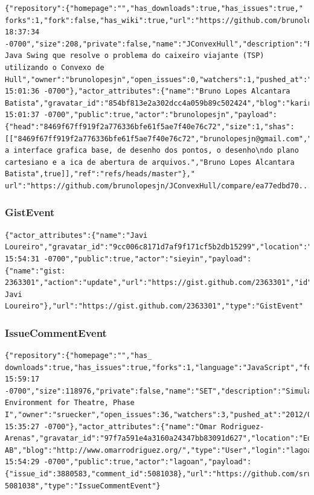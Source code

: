 \documentclass[a4paper,10pt]{article}
\begin{document}
\begin{lstlisting}
{"repository":{"homepage":"","has_downloads":true,"has_issues":true,"
forks":1,"fork":false,"has_wiki":true,"url":"https://github.com/brunolopesjn/JConvexHull","created_at":"2012/04/10 18:37:34 -0700","size":208,"private":false,"name":"JConvexHull","description":"Programa Java Swing que resolve o problema do caixeiro viajante (TSP) utilizando o Convexo de Hull","owner":"brunolopesjn","open_issues":0,"watchers":1,"pushed_at":"2012/04/11 15:01:36 -0700"},"actor_attributes":{"name":"Bruno Lopes Alcantara Batista","gravatar_id":"854bf813e2a302dcc4a059b89c502424","blog":"kariridev.blogspot.com","type":"User","login":"brunolopesjn","email":"brunolopesjn@gmail.com"},"created_at":"2012/04/11 15:01:37 -0700","public":true,"actor":"brunolopesjn","payload":{"head":"8469f67ff919f2a776336bfe61f5ae7f40e76c72","size":1,"shas":[["8469f67ff919f2a776336bfe61f5ae7f40e76c72","brunolopesjn@gmail.com","Criado a interface grafica base, de desenho dos pontos, o desenho\ndo plano cartesiano e a ica de abertura de arquivos.","Bruno Lopes Alcantara Batista",true]],"ref":"refs/heads/master"},"
url":"https://github.com/brunolopesjn/JConvexHull/compare/ea77edbd70...8469f67ff9","type":"PushEvent"}
\end{lstlisting}


\subsubsection{GistEvent}
\begin{lstlisting}
{"actor_attributes":{"name":"Javi Loureiro","gravatar_id":"9cc006c8171d7af9f171cf5b2db15299","location":"Madrid","blog":"http://javiloureiro.com","type":"User","login":"sieyin"},"created_at":"2012/04/11 15:54:31 -0700","public":true,"actor":"sieyin","payload":{"name":"gist: 2363301","action":"update","url":"https://gist.github.com/2363301","id":2363301,"desc":"About Javi Loureiro"},"url":"https://gist.github.com/2363301","type":"GistEvent"
\end{lstlisting}



\subsubsection{IssueCommentEvent}
\begin{lstlisting}
{"repository":{"homepage":"","has_
downloads":true,"has_issues":true,"forks":1,"language":"JavaScript","fork":false,"has_wiki":true,"url":"https://github.com/sruecker/SET","created_at":"2012/03/14 15:59:17 -0700","size":118976,"private":false,"name":"SET","description":"Simulated Environment for Theatre, Phase I","owner":"sruecker","open_issues":36,"watchers":3,"pushed_at":"2012/04/11 15:35:27 -0700"},"actor_attributes":{"name":"Omar Rodriguez-Arenas","gravatar_id":"97f7a591e4a3160a24347bb83091d627","location":"Edmonton, AB","blog":"http://www.omarrodriguez.org/","type":"User","login":"lagoan"},"created_at":"2012/04/11 15:54:29 -0700","public":true,"actor":"lagoan","payload":{"issue_id":3880583,"comment_id":5081038},"url":"https://github.com/sruecker/SET/issues/52#issuecomment-5081038","type":"IssueCommentEvent"}
\end{lstlisting}
\end{document}
